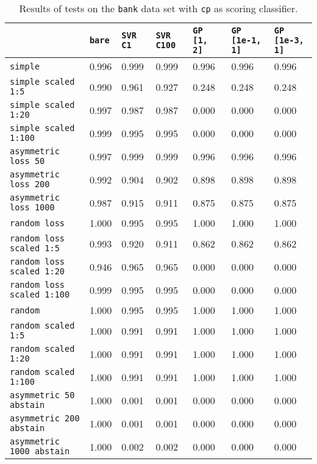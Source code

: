 \begin{table}[H]
{\scriptsize
\begin{tabu}{l|l|l|l|l|l|l}
&\texttt{bare} &\texttt{SVR C1} &\texttt{SVR C100} &\texttt{GP [1, 2]} &\texttt{GP [1e-1, 1]} &\texttt{GP [1e-3, 1]}  \\
\hline
\texttt{simple} &0.996 &0.999 &0.999 &0.996 &0.996 &0.996 \\
\texttt{simple scaled 1:5} &0.990 &0.961 &0.927 &0.248 &0.248 &0.248 \\
\texttt{simple scaled 1:20} &0.997 &0.987 &0.987 &0.000 &0.000 &0.000 \\
\texttt{simple scaled 1:100} &0.999 &0.995 &0.995 &0.000 &0.000 &0.000 \\
\texttt{asymmetric loss 50} &0.997 &0.999 &0.999 &0.996 &0.996 &0.996 \\
\texttt{asymmetric loss 200} &0.992 &0.904 &0.902 &0.898 &0.898 &0.898 \\
\texttt{asymmetric loss 1000} &0.987 &0.915 &0.911 &0.875 &0.875 &0.875 \\
\texttt{random loss} &1.000 &0.995 &0.995 &1.000 &1.000 &1.000 \\
\texttt{random loss scaled 1:5} &0.993 &0.920 &0.911 &0.862 &0.862 &0.862 \\
\texttt{random loss scaled 1:20} &0.946 &0.965 &0.965 &0.000 &0.000 &0.000 \\
\texttt{random loss scaled 1:100} &0.999 &0.995 &0.995 &0.000 &0.000 &0.000 \\
\texttt{random} &1.000 &0.995 &0.995 &1.000 &1.000 &1.000 \\
\texttt{random scaled 1:5} &1.000 &0.991 &0.991 &1.000 &1.000 &1.000 \\
\texttt{random scaled 1:20} &1.000 &0.991 &0.991 &1.000 &1.000 &1.000 \\
\texttt{random scaled 1:100} &1.000 &0.991 &0.991 &1.000 &1.000 &1.000 \\
\texttt{asymmetric 50 abstain} &1.000 &0.001 &0.001 &0.000 &0.000 &0.000 \\
\texttt{asymmetric 200 abstain} &1.000 &0.001 &0.001 &0.000 &0.000 &0.000 \\
\texttt{asymmetric 1000 abstain} &1.000 &0.002 &0.002 &0.000 &0.000 &0.000 \\
\end{tabu} }
\caption{Results of tests on the \texttt{bank} data set
         with \texttt{cp} as scoring classifier.}
\end{table}

